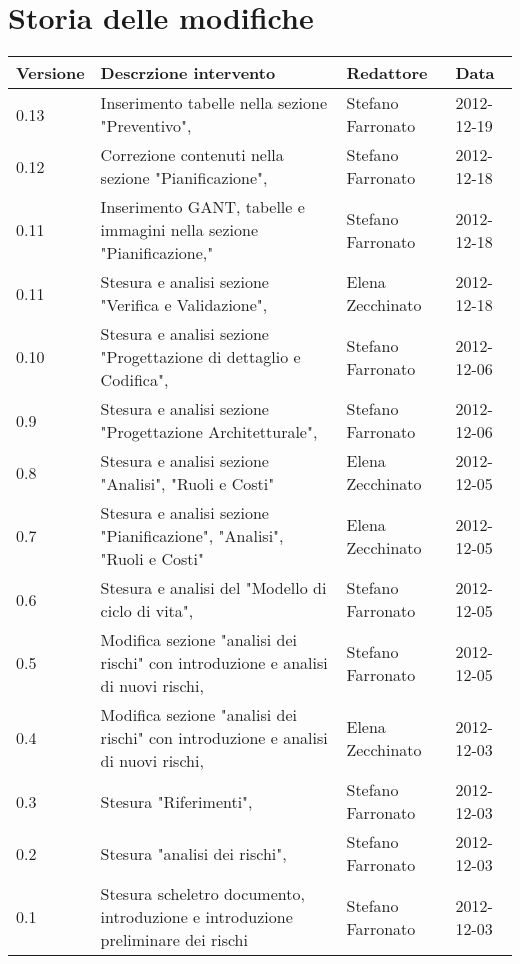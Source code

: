 \section*{Storia delle modifiche}
\begin{tabularx}{\textwidth}{lXll}
\toprule
Versione & Descrzione intervento & Redattore & Data\\
\midrule %
0.13 &Inserimento tabelle nella sezione "Preventivo", & Stefano Farronato & 2012-12-19\\
0.12 &Correzione contenuti nella sezione "Pianificazione", & Stefano Farronato & 2012-12-18\\
0.11 &Inserimento GANT, tabelle e immagini nella sezione "Pianificazione," & Stefano Farronato & 2012-12-18\\
0.11 &Stesura e analisi sezione "Verifica e Validazione", & Elena Zecchinato & 2012-12-18\\
0.10 &Stesura e analisi sezione "Progettazione di dettaglio e Codifica", & Stefano Farronato & 2012-12-06\\
0.9 &Stesura e analisi sezione "Progettazione Architetturale", & Stefano Farronato & 2012-12-06\\
0.8 &Stesura e analisi sezione "Analisi", "Ruoli e Costi" & Elena Zecchinato & 2012-12-05\\
0.7 &Stesura e analisi sezione "Pianificazione", "Analisi", "Ruoli e Costi" & Elena Zecchinato & 2012-12-05\\
0.6 &Stesura e analisi del "Modello di ciclo di vita", & Stefano Farronato & 2012-12-05\\
0.5 &Modifica sezione "analisi dei rischi" con introduzione e analisi di nuovi rischi, & Stefano Farronato & 2012-12-05\\
0.4 & Modifica sezione "analisi dei rischi" con introduzione e analisi di nuovi rischi, & Elena Zecchinato & 2012-12-03\\
0.3 & Stesura "Riferimenti", & Stefano Farronato & 2012-12-03\\
0.2 & Stesura "analisi dei rischi", & Stefano Farronato & 2012-12-03\\
0.1 & Stesura scheletro documento, introduzione e introduzione preliminare dei rischi & Stefano Farronato & 2012-12-03\\
\bottomrule
\end{tabularx}
\newpage



\setcounter{page}{1}
\pagestyle{normal}

